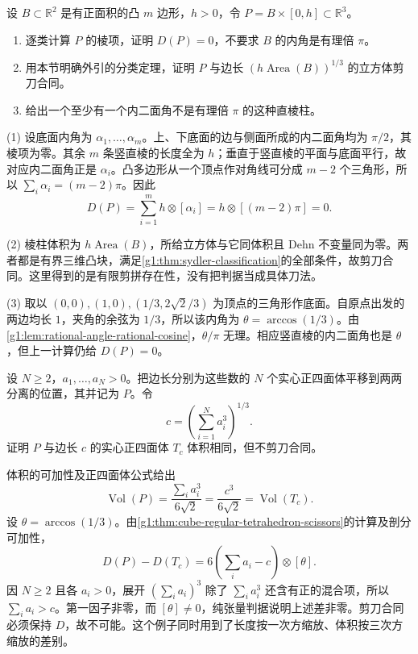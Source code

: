 \begin{exercise}
	\label{g1:ex:right-prism-dehn}
	设 \(B\subset\mathbb R^2\) 是有正面积的凸 \(m\) 边形，\(h>0\)，令 \(P=B\times[0,h]\subset\mathbb R^3\)。
	\begin{enumerate}
		\item 逐类计算 \(P\) 的棱项，证明 \(D(P)=0\)，不要求 \(B\) 的内角是有理倍 \(\pi\)。
		\item 用本节明确外引的分类定理，证明 \(P\) 与边长 \((h\operatorname{Area}(B))^{1/3}\) 的立方体剪刀合同。
		\item 给出一个至少有一个内二面角不是有理倍 \(\pi\) 的这种直棱柱。
	\end{enumerate}
\end{exercise}
\begin{solution}
	(1) 设底面内角为 \(\alpha_1,\ldots,\alpha_m\)。上、下底面的边与侧面所成的内二面角均为 \(\pi/2\)，其棱项为零。其余 \(m\) 条竖直棱的长度全为 \(h\)；垂直于竖直棱的平面与底面平行，故对应内二面角正是 \(\alpha_i\)。凸多边形从一个顶点作对角线可分成 \(m-2\) 个三角形，所以 \(\sum_i\alpha_i=(m-2)\pi\)。因此
	\[
		D(P)=\sum_{i=1}^m h\otimes[\alpha_i]
		=h\otimes[(m-2)\pi]=0.
	\]

	(2) 棱柱体积为 \(h\operatorname{Area}(B)\)，所给立方体与它同体积且 Dehn 不变量同为零。两者都是有界三维凸块，满足\cref{g1:thm:sydler-classification}的全部条件，故剪刀合同。这里得到的是有限剪拼存在性，没有把判据当成具体刀法。

	(3) 取以 \((0,0),(1,0),(1/3,2\sqrt2/3)\) 为顶点的三角形作底面。自原点出发的两边均长 \(1\)，夹角的余弦为 \(1/3\)，所以该内角为 \(\theta=\arccos(1/3)\)。由\cref{g1:lem:rational-angle-rational-cosine}，\(\theta/\pi\) 无理。相应竖直棱的内二面角也是 \(\theta\)，但上一计算仍给 \(D(P)=0\)。
\end{solution}

\begin{exercise}
	\label{g1:ex:several-tetrahedra-dehn}
	设 \(N\ge2\)，\(a_1,\ldots,a_N>0\)。把边长分别为这些数的 \(N\) 个实心正四面体平移到两两分离的位置，其并记为 \(P\)。令
	\[
		c=\left(\sum_{i=1}^Na_i^3\right)^{1/3}.
	\]
	证明 \(P\) 与边长 \(c\) 的实心正四面体 \(T_c\) 体积相同，但不剪刀合同。
\end{exercise}
\begin{solution}
	体积的可加性及正四面体公式给出
	\[
		\operatorname{Vol}(P)
		=\frac{\sum_i a_i^3}{6\sqrt2}
		=\frac{c^3}{6\sqrt2}
		=\operatorname{Vol}(T_c).
	\]
	设 \(\theta=\arccos(1/3)\)。由\cref{g1:thm:cube-regular-tetrahedron-scissors}的计算及剖分可加性，
	\[
		D(P)-D(T_c)
		=6\left(\sum_i a_i-c\right)\otimes[\theta].
	\]
	因 \(N\ge2\) 且各 \(a_i>0\)，展开 \((\sum_i a_i)^3\) 除了 \(\sum_i a_i^3\) 还含有正的混合项，所以 \(\sum_i a_i>c\)。第一因子非零，而 \([\theta]\ne0\)，纯张量判据说明上述差非零。剪刀合同必须保持 \(D\)，故不可能。这个例子同时用到了长度按一次方缩放、体积按三次方缩放的差别。
\end{solution}

